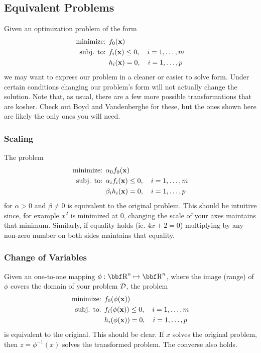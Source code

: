 \documentclass{article}
\begin{document}
\subsection{Equivalent Problems}

Given an optimization problem of the form
\begin{align*}
    \text{minimize: } & f_0({\bf x})\\
    \text{subj. to: } & f_i({\bf x}) \leq 0, \quad i=1,\dots,m\\
                      & h_i({\bf x}) = 0, \quad i=1,\dots,p
\end{align*}
we may want to express our problem in a cleaner or easier
to solve form. Under certain conditions changing our problem's
form will not actually change the solution. Note that, as usual,
there are a few more possible transformations that are kosher.
Check out Boyd and Vandenberghe for these, but the ones shown here
are likely the only ones you will need.

\subsubsection{Scaling}

The problem
\begin{align*}
    \text{minimize: } & \alpha_0f_0({\bf x})\\
    \text{subj. to: } & \alpha_if_i({\bf x}) \leq 0, \quad i=1,\dots,m\\
                      & \beta_ih_i({\bf x}) = 0, \quad i=1,\dots,p
\end{align*}
for $\alpha > 0$ and $\beta \neq 0$ is equivalent to the original
problem. This should be intuitive since, for example $x^2$ is minimized
at 0, changing the scale of your axes maintains that minimum. Similarly,
if equality holds (ie. $4x+2=0$) multiplying by any non-zero number on
both sides maintains that equality.

\subsubsection{Change of Variables}

Given an one-to-one mapping $\phi : \RR^n \mapsto \RR^n$, where the image
(range) of $\phi$ covers the domain of your problem ${\cal D}$, the problem
\begin{align*}
    \text{minimize: } & f_0(\phi({\bf x}))\\
    \text{subj. to: } & f_i(\phi({\bf x})) \leq 0, \quad i=1,\dots,m\\
                      & h_i(\phi({\bf x})) = 0, \quad i=1,\dots,p
\end{align*}
is equivalent to the original. This should be clear. If $x$ solves the
original problem, then $z = \phi^{-1}(x)$ solves the transformed problem.
The converse also holds.
\end{document}

